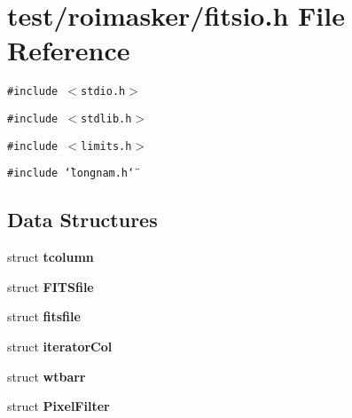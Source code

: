 \section{test/roimasker/fitsio.h File Reference}
\label{test_2roimasker_2fitsio_8h}
{\tt \#include $<$stdio.h$>$}\par
{\tt \#include $<$stdlib.h$>$}\par
{\tt \#include $<$limits.h$>$}\par
{\tt \#include \char`\"{}longnam.h\char`\"{}}\par
\subsection*{Data Structures}
\begin{CompactItemize}
\item 
struct \bf{tcolumn}
\item 
struct \bf{FITSfile}
\item 
struct \bf{fitsfile}
\item 
struct \bf{iterator\-Col}
\item 
struct \bf{wtbarr}
\item 
struct \bf{Pixel\-Filter}
\end{CompactItemize}
